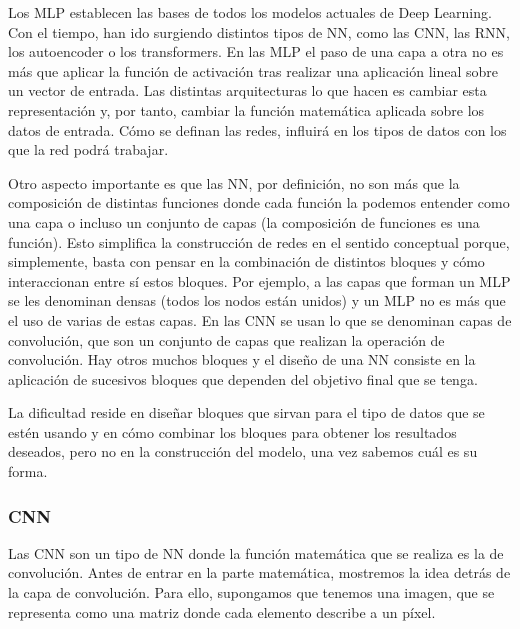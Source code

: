\documentclass[a4paper,12pt,oneside,titlepage]{book}
\begin{document}
Los MLP establecen las bases de todos los modelos actuales de Deep Learning. Con el tiempo, han ido surgiendo distintos tipos de NN, como las CNN, las RNN, los autoencoder o los transformers. En las MLP el paso de una capa a otra no es más que aplicar la función de activación tras realizar una aplicación lineal sobre un vector de entrada. Las distintas arquitecturas lo que hacen es cambiar esta representación y, por tanto, cambiar la función matemática aplicada sobre los datos de entrada. Cómo se definan las redes, influirá en los tipos de datos con los que la red podrá trabajar.

Otro aspecto importante es que las NN, por definición, no son más que la composición de distintas funciones donde cada función la podemos entender como una capa o incluso un conjunto de capas (la composición de funciones es una función). Esto simplifica la construcción de redes en el sentido conceptual porque, simplemente, basta con pensar en la combinación de distintos bloques y cómo interaccionan entre sí estos bloques. Por ejemplo, a las capas que forman un MLP se les denominan densas (todos los nodos están unidos) y un MLP no es más que el uso de varias de estas capas. En las CNN se usan lo que se denominan capas de convolución, que son un conjunto de capas que realizan la operación de convolución. Hay otros muchos bloques y el diseño de una NN consiste en la aplicación de sucesivos bloques que dependen del objetivo final que se tenga.

La dificultad reside en diseñar bloques que sirvan para el tipo de datos que se estén usando y en cómo combinar los bloques para obtener los resultados deseados, pero no en la construcción del modelo, una vez sabemos cuál es su forma.

\subsubsection*{CNN}

Las CNN son un tipo de NN donde la función matemática que se realiza es la de convolución. Antes de entrar en la parte matemática, mostremos la idea detrás de la capa de convolución. Para ello, supongamos que tenemos una imagen, que se representa como una matriz donde cada elemento describe a un píxel.
\end{document}
